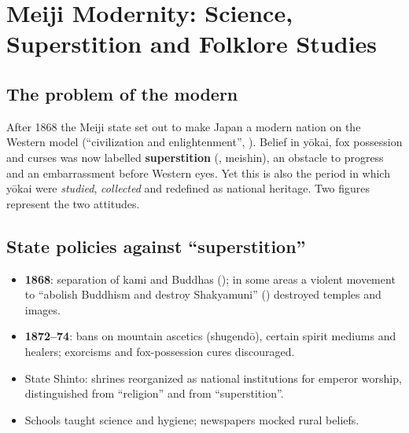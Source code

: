 \chapter{Meiji Modernity: Science, Superstition and Folklore Studies}

\section{The problem of the modern}

After 1868 the Meiji state set out to make Japan a modern nation on the Western model
(``civilization and enlightenment'', ). Belief in yōkai, fox possession and
curses was now labelled \textbf{superstition} (, meishin), an obstacle to
progress and an embarrassment before Western eyes. Yet this is also the period in which
yōkai were \emph{studied}, \emph{collected} and redefined as national heritage. Two figures
represent the two attitudes.

\begin{center}
\end{center}

\section{State policies against ``superstition''}

\begin{itemize}
  \item \textbf{1868}: separation of kami and Buddhas (); in some areas a
        violent movement to ``abolish Buddhism and destroy Shakyamuni'' ()
        destroyed temples and images.
  \item \textbf{1872--74}: bans on mountain ascetics (shugendō), certain spirit mediums and
        healers; exorcisms and fox-possession cures discouraged.
  \item State Shinto: shrines reorganized as national institutions for emperor worship,
        distinguished from ``religion'' and from ``superstition''.
  \item Schools taught science and hygiene; newspapers mocked rural beliefs.
\end{itemize}

